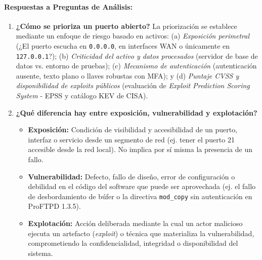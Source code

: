 \documentclass[11pt,letterpaper]{article}
\begin{document}
\paragraph{Respuestas a Preguntas de Análisis:}
\begin{enumerate}
    \item \textbf{¿Cómo se prioriza un puerto abierto?} La priorización se establece mediante un enfoque de riesgo basado en activos: (a) \textit{Exposición perimetral} (¿El puerto escucha en \texttt{0.0.0.0}, en interfaces WAN o únicamente en \texttt{127.0.0.1}?); (b) \textit{Criticidad del activo y datos procesados} (servidor de base de datos vs. entorno de pruebas); (c) \textit{Mecanismo de autenticación} (autenticación ausente, texto plano o llaves robustas con MFA); y (d) \textit{Puntaje CVSS y disponibilidad de exploits públicos} (evaluación de \textit{Exploit Prediction Scoring System} - EPSS y catálogo KEV de CISA).
    \item \textbf{¿Qué diferencia hay entre exposición, vulnerabilidad y explotación?}
    \begin{itemize}
        \item \textbf{Exposición:} Condición de visibilidad y accesibilidad de un puerto, interfaz o servicio desde un segmento de red (ej. tener el puerto 21 accesible desde la red local). No implica por sí misma la presencia de un fallo.
        \item \textbf{Vulnerabilidad:} Defecto, fallo de diseño, error de configuración o debilidad en el código del software que puede ser aprovechada (ej. el fallo de desbordamiento de búfer o la directiva \texttt{mod\_copy} sin autenticación en ProFTPD 1.3.5).
        \item \textbf{Explotación:} Acción deliberada mediante la cual un actor malicioso ejecuta un artefacto (\textit{exploit}) o técnica que materializa la vulnerabilidad, comprometiendo la confidencialidad, integridad o disponibilidad del sistema.
    \end{itemize}
\end{enumerate}
\end{document}
